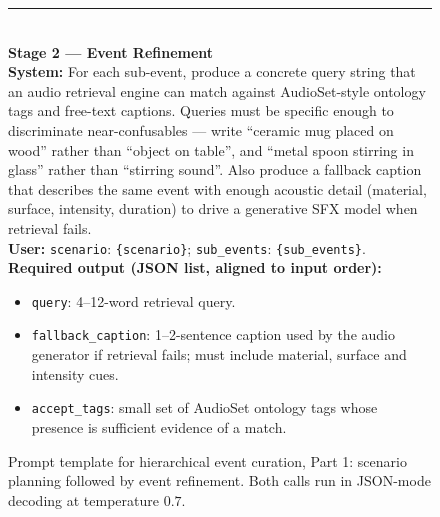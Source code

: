 \documentclass{llmxive}
\begin{document}
\begin{figure}[!htbp]
\begin{tcolorbox}
\rule{\linewidth}{0.4pt}\\[2pt]

\textbf{Stage 2 --- Event Refinement}\\[1pt]
\textbf{System:} For each sub-event, produce a concrete query string
that an audio retrieval engine can match against AudioSet-style ontology
tags and free-text captions. Queries must be specific enough to
discriminate near-confusables --- write ``ceramic mug placed on wood''
rather than ``object on table'', and ``metal spoon stirring in glass''
rather than ``stirring sound''. Also produce a fallback caption that
describes the same event with enough acoustic detail (material, surface,
intensity, duration) to drive a generative SFX model when retrieval
fails.\\[2pt]
\textbf{User:} \texttt{scenario}: \verb|{scenario}|;\quad
\texttt{sub\_events}: \verb|{sub_events}|.\\[2pt]
\textbf{Required output (JSON list, aligned to input order):}
\begin{itemize}\setlength\itemsep{0pt}\setlength\topsep{0pt}
  \item \texttt{query}: 4--12-word retrieval query.
  \item \texttt{fallback\_caption}: 1--2-sentence caption used by the
        audio generator if retrieval fails; must include material,
        surface and intensity cues.
  \item \texttt{accept\_tags}: small set of AudioSet ontology tags whose
        presence is sufficient evidence of a match.
\end{itemize}
\end{tcolorbox}
\caption{Prompt template for hierarchical event curation, Part 1:
scenario planning followed by event refinement. Both calls run in
JSON-mode decoding at temperature $0.7$.}
\label{prompt:curation-p1}
\end{figure}
\end{document}
